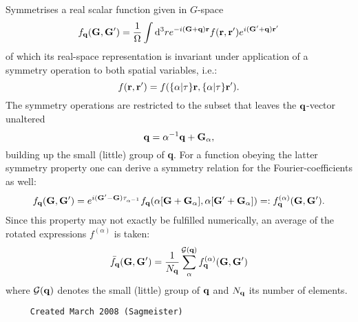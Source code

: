 \documentclass[11pt]{article}
\begin{document}
     Symmetrises a real scalar function given in $G$-space
     $$ f_{\bf q}({\bf G},{\bf G'}) = \frac{1}{\Omega}\int {\rm d}^3r 
     e^{-i{\bf (G+q)r}} f({\bf r},{\bf r'}) e^{i{\bf (G'}+{\bf q}){\bf r'}} $$
     of which its real-space representation is invariant under application of
     a symmetry  operation to both spatial variables, i.e.:
     $$ f({\bf r},{\bf r'}) = f(\{\alpha|\tau\}{\bf r},\{\alpha|\tau\}{\bf r'}).
     $$
     The symmetry operations are restricted to the subset that leaves the
     ${\bf q}$-vector unaltered
     $$ {\bf q}=\alpha^{-1}{\bf q} + {\bf G}_{\alpha},  $$
     building up the small (little) group of {\bf q}.
     For a function obeying the latter symmetry property one can derive a
     symmetry relation for the Fourier-coefficients as well:
     $$ f_{\bf q}({\bf G},{\bf G'}) =  
     e^{i({\bf G'}-{\bf G})\tau_{\alpha^{-1}}} 
     f_{\bf q}(\alpha[{\bf G}+{\bf G}_{\alpha}],
     \alpha[{\bf G'}+{\bf G}_{\alpha}]) =: f^{(\alpha)}_{\bf q}({\bf G},
     {\bf G'}).$$
     Since this property may not exactly be fulfilled numerically, an average
     of the rotated expressions $f^{(\alpha)}$ is taken:
     $$  \bar{f}_{\bf q}({\bf G},{\bf G'})= \frac{1}{N_{\bf q}}
     \sum_{\alpha}^{\mathcal{G}({\bf q})}
     f^{(\alpha)}_{\bf q}({\bf G},{\bf G'}) $$
     where $\mathcal{G}({\bf q})$ denotes the small (little) group of ${\bf q}$
     and $N_{\bf q}$ its number of elements.
  
\begin{verbatim}     Created March 2008 (Sagmeister)\end{verbatim}















\end{document}
